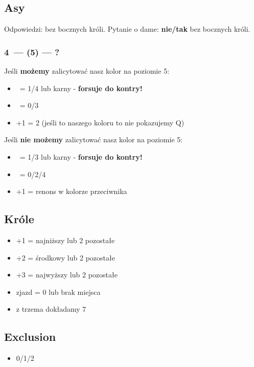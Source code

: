 \documentclass[12pt, a4paper]{article}
\begin{document}
\subsection*{Asy}
Odpowiedzi: bez bocznych króli. Pytanie o dame: \textbf{nie/tak} bez bocznych króli.
\subsubsection*{4\ntx\ --- (5\minor\major) --- ?}
Jeśli \textbf{możemy} zalicytować nasz kolor na poziomie 5:
\begin{itemize}
    \item \pass\ = 1/4 lub karny - \textbf{forsuje do kontry!}
    \item \dbl\ = 0/3
    \item +1 = 2 (jeśli to naszego koloru to nie pokazujemy Q)
\end{itemize}
Jeśli \textbf{nie możemy} zalicytować nasz kolor na poziomie 5:
\begin{itemize}
    \item \pass\ = 1/3 lub karny - \textbf{forsuje do kontry!}
    \item \dbl\ = 0/2/4
    \item +1 = renons w kolorze przeciwnika
\end{itemize}

\subsection*{Króle}
\begin{itemize}
    \item +1 = najniższy lub 2 pozostałe
    \item +2 = środkowy lub 2 pozostałe
    \item +3 = najwyższy lub 2 pozostałe
    \item zjazd = 0 lub brak miejsca
    \item z trzema dokładamy 7
\end{itemize}

\subsection*{Exclusion}
\begin{itemize}
    \item 0/1/2
\end{itemize}
\end{document}
